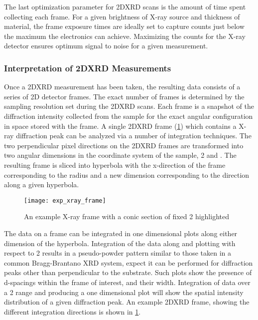 The last optimization parameter for 2DXRD scans is the amount of time spent collecting each frame.
For a given brightness of X-ray source and thickness of material, the frame exposure times are ideally set to capture counts just below the maximum the electronics can achieve.
Maximizing the counts for the X-ray detector ensures optimum signal to noise for a given measurement.

\subsubsection{Interpretation of 2DXRD Measurements} Once a 2DXRD measurement has been taken, the resulting data consists of a series of 2D detector frames.
The exact number of frames is determined by the sampling resolution set during the 2DXRD scans.
Each frame is a snapshot of the diffraction intensity collected from the sample for the exact angular configuration in space stored with the frame.
A single 2DXRD frame (\cref{fig:exp_xray_frame}) which contains a X-ray diffraction peak can be analyzed via a number of integration techniques.
The two perpendicular pixel directions on the 2DXRD frames are transformed into two angular dimensions in the coordinate system of the sample, 2\straighttheta{} and \textchi{} \cite{He2009}.
The resulting frame is sliced into hyperbola with the x-direction of the frame corresponding to the radius and a new dimension \textchi{} corresponding to the direction along a given hyperbola.
\begin{figure}
 \centering \texttt{[image: exp\_xray\_frame]}
 \caption[Example 2DXRD frame]{\label{fig:exp_xray_frame}An example X-ray frame with a conic section of fixed 2\straighttheta{} highlighted}
\end{figure}

The data on a frame can be integrated in one dimensional plots along either dimension of the hyperbola.
Integration of the data along \textchi{} and plotting with respect to 2\straighttheta{} results in a pseudo-powder pattern similar to those taken in a common Bragg-Brantano XRD system, expect it can be performed for diffraction peaks other than perpendicular to the substrate.
Such plots show the presence of d-spacings within the frame of interest, and their width.
Integration of data over a 2\straighttheta{} range and producing a one dimensional plot will show the spatial intensity distribution of a given diffraction peak.
An example 2DXRD frame, showing the different integration directions is shown in \cref{fig:exp_xray_frame}.

